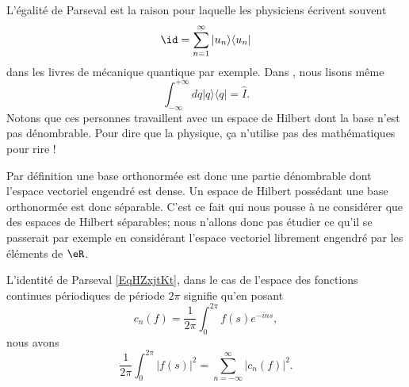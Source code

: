 \begin{remark}
    L'égalité de Parseval est la raison pour laquelle les physiciens écrivent souvent
    \begin{equation}
        \id=\sum_{n=1}^{\infty}|u_n\rangle\langle u_n|
    \end{equation}
    dans les livres de mécanique quantique par exemple. Dans \cite{SchomblondQEDQCD}, nous lisons même 
    \begin{equation}
        \int_{-\infty}^{+\infty}dq|q\rangle\langle q| =\hat I.
    \end{equation}
    Notons que ces personnes travaillent avec un espace de Hilbert dont la base n'est pas dénombrable. Pour dire que la physique, ça n'utilise pas des mathématiques pour rire !
\end{remark}

\begin{remark}
    Par définition une base orthonormée est donc une partie dénombrable dont l'espace vectoriel engendré est dense. Un espace de Hilbert possédant une base orthonormée est donc séparable. C'est ce fait qui nous pousse à ne considérer que des espaces de Hilbert séparables; nous n'allons donc pas étudier ce qu'il se passerait par exemple en considérant l'espace vectoriel librement engendré par les éléments de \( \eR\).
\end{remark}

\begin{example}
    L'identité de Parseval \eqref{EqHZxjtKt}, dans le cas de l'espace des fonctions continues périodiques de période \( 2\pi\) signifie qu'en posant 
    \begin{equation}
        c_n(f)=\frac{1}{ 2\pi }\int_0^{2\pi}f(s) e^{-ins},
    \end{equation}
    nous avons
    \begin{equation}    \label{EqMIuCSfz}
        \frac{1}{ 2\pi }\int_0^{2\pi}| f(s) |^2=\sum_{n=-\infty}^{\infty}| c_n(f) |^2.
    \end{equation}
\end{example}

